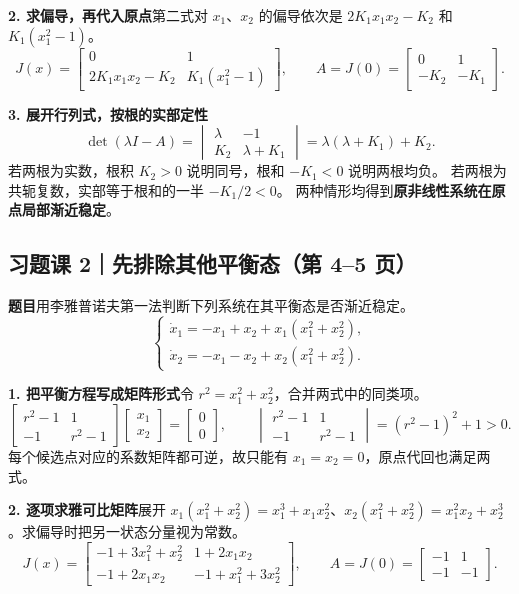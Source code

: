 \documentclass[UTF8,a4paper,11pt,fontset=fandol]{ctexart}
\begin{document}
\textbf{2. 求偏导，再代入原点}\quad 第二式对 $x_1$、$x_2$ 的偏导依次是 $2K_1x_1x_2-K_2$ 和 $K_1(x_1^2-1)$。
\[
  J(x)=\begin{bmatrix}0&1\\2K_1x_1x_2-K_2&K_1(x_1^2-1)\end{bmatrix},\qquad
  A=J(0)=\begin{bmatrix}0&1\\-K_2&-K_1\end{bmatrix}.
\]

\textbf{3. 展开行列式，按根的实部定性}\quad
\[
  \det(\lambda I-A)
  =\begin{vmatrix}\lambda&-1\\ K_2&\lambda+K_1\end{vmatrix}
  =\lambda(\lambda+K_1)+K_2.
\]
若两根为实数，根积 $K_2>0$ 说明同号，根和 $-K_1<0$ 说明两根均负。
若两根为共轭复数，实部等于根和的一半 $-K_1/2<0$。
两种情形均得到\textbf{原非线性系统在原点局部渐近稳定}。

\newpage
\subsection*{习题课 2｜先排除其他平衡态（第 4--5 页）}\label{prob:exercise2}

\textbf{题目}\quad 用李雅普诺夫第一法判断下列系统在其平衡态是否渐近稳定。
\[
  \begin{cases}
    \dot x_1=-x_1+x_2+x_1(x_1^2+x_2^2),\\
    \dot x_2=-x_1-x_2+x_2(x_1^2+x_2^2).
  \end{cases}
\]

\textbf{1. 把平衡方程写成矩阵形式}\quad 令 $r^2=x_1^2+x_2^2$，合并两式中的同类项。
\[
  \begin{bmatrix}r^2-1&1\\-1&r^2-1\end{bmatrix}
  \begin{bmatrix}x_1\\x_2\end{bmatrix}
  =\begin{bmatrix}0\\0\end{bmatrix},\qquad
  \begin{vmatrix}r^2-1&1\\-1&r^2-1\end{vmatrix}=(r^2-1)^2+1>0.
\]
每个候选点对应的系数矩阵都可逆，故只能有 $x_1=x_2=0$，原点代回也满足两式。

\textbf{2. 逐项求雅可比矩阵}\quad 展开 $x_1(x_1^2+x_2^2)=x_1^3+x_1x_2^2$、$x_2(x_1^2+x_2^2)=x_1^2x_2+x_2^3$。求偏导时把另一状态分量视为常数。
\[
  J(x)=\begin{bmatrix}
    -1+3x_1^2+x_2^2&1+2x_1x_2\\
    -1+2x_1x_2&-1+x_1^2+3x_2^2
  \end{bmatrix},\qquad
  A=J(0)=\begin{bmatrix}-1&1\\-1&-1\end{bmatrix}.
\]
\end{document}
